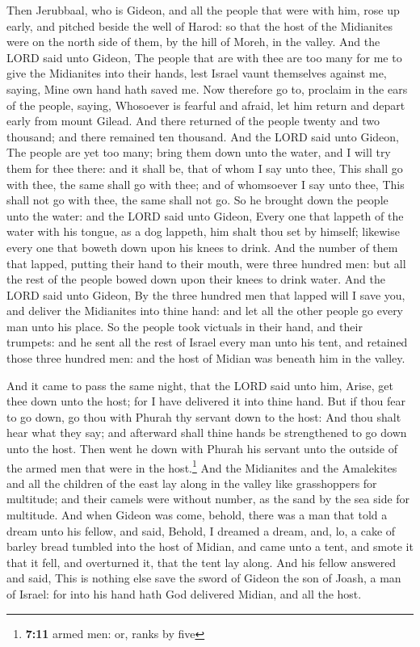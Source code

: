  Then Jerubbaal, who is Gideon, and all the people that
were with him, rose up early, and pitched beside the well of Harod: so
that the host of the Midianites were on the north side of them, by the
hill of Moreh, in the valley.  And the LORD said unto
Gideon, The people that are with thee are too many for me to give the
Midianites into their hands, lest Israel vaunt themselves against me,
saying, Mine own hand hath saved me.  Now therefore go to,
proclaim in the ears of the people, saying, Whosoever is fearful and
afraid, let him return and depart early from mount Gilead. And there
returned of the people twenty and two thousand; and there remained ten
thousand.  And the LORD said unto Gideon, The people are
yet too many; bring them down unto the water, and I will try them for
thee there: and it shall be, that of whom I say unto thee, This shall go
with thee, the same shall go with thee; and of whomsoever I say unto
thee, This shall not go with thee, the same shall not go. 
So he brought down the people unto the water: and the LORD said unto
Gideon, Every one that lappeth of the water with his tongue, as a dog
lappeth, him shalt thou set by himself; likewise every one that boweth
down upon his knees to drink.  And the number of them that
lapped, putting their hand to their mouth, were three hundred men: but
all the rest of the people bowed down upon their knees to drink water.
 And the LORD said unto Gideon, By the three hundred men
that lapped will I save you, and deliver the Midianites into thine hand:
and let all the other people go every man unto his place. 
So the people took victuals in their hand, and their trumpets: and he
sent all the rest of Israel every man unto his tent, and retained those
three hundred men: and the host of Midian was beneath him in the valley.

 And it came to pass the same night, that the LORD said
unto him, Arise, get thee down unto the host; for I have delivered it
into thine hand.  But if thou fear to go down, go thou
with Phurah thy servant down to the host:  And thou shalt
hear what they say; and afterward shall thine hands be strengthened to
go down unto the host. Then went he down with Phurah his servant unto
the outside of the armed men that were in the host.\footnote{\textbf{7:11}
  armed men: or, ranks by five}  And the Midianites and
the Amalekites and all the children of the east lay along in the valley
like grasshoppers for multitude; and their camels were without number,
as the sand by the sea side for multitude.  And when
Gideon was come, behold, there was a man that told a dream unto his
fellow, and said, Behold, I dreamed a dream, and, lo, a cake of barley
bread tumbled into the host of Midian, and came unto a tent, and smote
it that it fell, and overturned it, that the tent lay along.
 And his fellow answered and said, This is nothing else
save the sword of Gideon the son of Joash, a man of Israel: for into his
hand hath God delivered Midian, and all the host.

